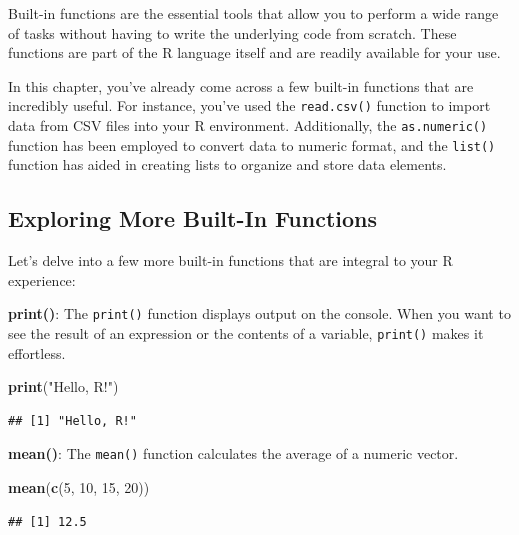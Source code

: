 \documentclass[
]{book}
\newenvironment{Shaded}{\begin{snugshade}}{\end{snugshade}}
\newcommand{\DecValTok}[1]{\textcolor[rgb]{0.00,0.00,0.81}{#1}}
\newcommand{\FunctionTok}[1]{\textcolor[rgb]{0.13,0.29,0.53}{\textbf{#1}}}
\newcommand{\NormalTok}[1]{#1}
\newcommand{\StringTok}[1]{\textcolor[rgb]{0.31,0.60,0.02}{#1}}
\begin{document}
Built-in functions are the essential tools that allow you to perform a wide range of tasks without having to write the underlying code from scratch. These functions are part of the R language itself and are readily available for your use.

In this chapter, you've already come across a few built-in functions that are incredibly useful. For instance, you've used the \texttt{read.csv()} function to import data from CSV files into your R environment. Additionally, the \texttt{as.numeric()} function has been employed to convert data to numeric format, and the \texttt{list()} function has aided in creating lists to organize and store data elements.

\hypertarget{exploring-more-built-in-functions}{%
\subsection{Exploring More Built-In Functions}\label{exploring-more-built-in-functions}}

Let's delve into a few more built-in functions that are integral to your R experience:

\textbf{print()}: The \texttt{print()} function displays output on the console. When you want to see the result of an expression or the contents of a variable, \texttt{print()} makes it effortless.

\begin{Shaded}
\begin{Highlighting}[]
\FunctionTok{print}\NormalTok{(}\StringTok{"Hello, R!"}\NormalTok{)}
\end{Highlighting}
\end{Shaded}

\begin{verbatim}
## [1] "Hello, R!"
\end{verbatim}

\textbf{mean()}: The \texttt{mean()} function calculates the average of a numeric vector.

\begin{Shaded}
\begin{Highlighting}[]
\FunctionTok{mean}\NormalTok{(}\FunctionTok{c}\NormalTok{(}\DecValTok{5}\NormalTok{, }\DecValTok{10}\NormalTok{, }\DecValTok{15}\NormalTok{, }\DecValTok{20}\NormalTok{))}
\end{Highlighting}
\end{Shaded}

\begin{verbatim}
## [1] 12.5
\end{verbatim}
\end{document}
